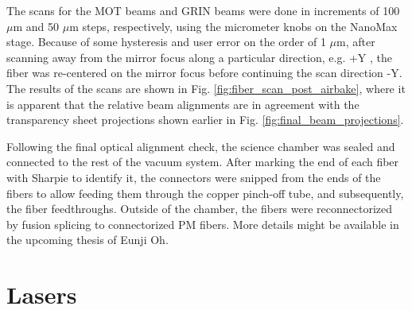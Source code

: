 The scans for the MOT beams and GRIN beams were done in increments of 100 $\mu \mathrm{m}$ and 50 $\mu \mathrm{m}$ steps, respectively, using the micrometer knobs on the NanoMax stage. Because of some hysteresis and user error on the order of 1 $\mu \mathrm{m}$, after scanning away from the mirror focus along a particular direction, e.g. +Y , the fiber was re-centered on the mirror focus before continuing the scan direction -Y. The results of the scans are shown in Fig. \ref{fig:fiber_scan_post_airbake}, where it is apparent that the relative beam alignments are in agreement with the transparency sheet projections shown earlier in Fig. \ref{fig:final_beam_projections}. 


Following the final optical alignment check, the science chamber was sealed and connected to the rest of the vacuum system. After marking the end of each fiber with Sharpie to identify it, the connectors were snipped from the ends of the fibers to allow feeding them through the copper pinch-off tube, and subsequently, the fiber feedthroughs. Outside of the chamber, the fibers were reconnectorized by fusion splicing to connectorized PM fibers. More details might be available in the upcoming thesis of Eunji Oh.

\section{Lasers}

